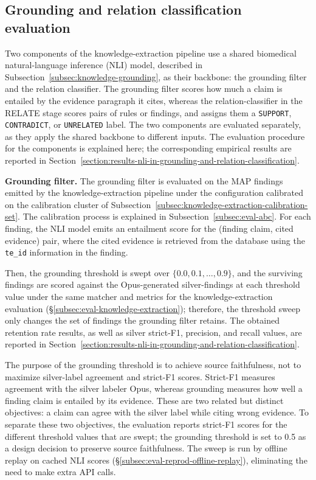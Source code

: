 \subsection{Grounding and relation classification evaluation}\label{subsec:eval-grounding-and-relation-classification}

Two components of the knowledge-extraction pipeline use a shared biomedical natural-language inference (NLI) model, described in Subsection~\ref{subsec:knowledge-grounding}, as their backbone: the grounding filter and the relation classifier. The grounding filter scores how much a claim is entailed by the evidence paragraph it cites, whereas the relation-classifier in the RELATE stage scores pairs of rules or findings, and assigns them a \texttt{SUPPORT}, \texttt{CONTRADICT}, or \texttt{UNRELATED} label. The two components are evaluated separately, as they apply the shared backbone to different inputs. The evaluation procedure for the components is explained here; the corresponding empirical results are reported in Section~\ref{section:results-nli-in-grounding-and-relation-classification}.

\medskip{}

\textbf{Grounding filter.} The grounding filter is evaluated on the MAP findings emitted by the knowledge-extraction pipeline under the configuration calibrated on the calibration cluster of Subsection~\ref{subsec:knowledge-extraction-calibration-set}. The calibration process is explained in Subsection~\ref{subsec:eval-abc}. For each finding, the NLI model emits an entailment score for the (finding claim, cited evidence) pair, where the cited evidence is retrieved from the database using the \texttt{te\_id} information in the finding.

Then, the grounding threshold is swept over $\{0.0, 0.1, \dots, 0.9\}$, and the surviving findings are scored against the Opus-generated silver-findings at each threshold value under the same matcher and metrics for the knowledge-extraction evaluation (§\ref{subsec:eval-knowledge-extraction}); therefore, the threshold sweep only changes the set of findings the grounding filter retains. The obtained retention rate results, as well as silver strict-F1, precision, and recall values, are reported in Section~\ref{section:results-nli-in-grounding-and-relation-classification}.

The purpose of the grounding threshold is to achieve source faithfulness, not to maximize silver-label agreement and strict-F1 scores. Strict-F1 measures agreement with the silver labeler Opus, whereas grounding measures how well a finding claim is entailed by its evidence. These are two related but distinct objectives: a claim can agree with the silver label while citing wrong evidence. To separate these two objectives, the evaluation reports strict-F1 scores for the different threshold values that are swept; the grounding threshold is set to 0.5 as a design decision to preserve source faithfulness. The sweep is run by offline replay on cached NLI scores (§\ref{subsec:eval-reprod-offline-replay}), eliminating the need to make extra API calls.

